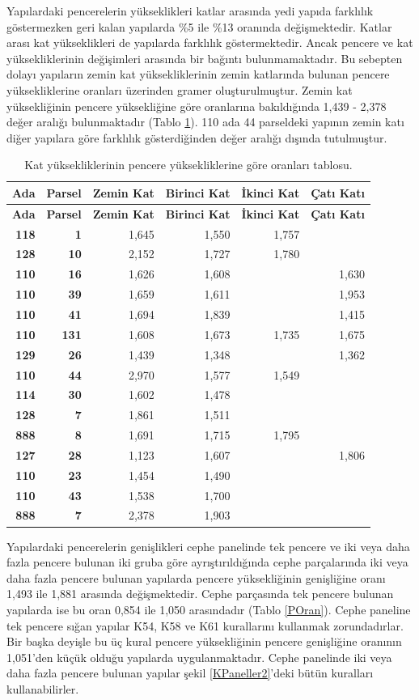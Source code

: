 \documentclass[12pt,turkish,a4paperpaper,]{report}
\begin{document}
Yapılardaki pencerelerin yükseklikleri katlar arasında yedi yapıda
farklılık göstermezken geri kalan yapılarda \%5 ile \%13 oranında
değişmektedir. Katlar arası kat yükseklikleri de yapılarda farklılık
göstermektedir. Ancak pencere ve kat yüksekliklerinin değişimleri
arasında bir bağıntı bulunmamaktadır. Bu sebepten dolayı yapıların zemin
kat yüksekliklerinin zemin katlarında bulunan pencere yüksekliklerine
oranları üzerinden gramer oluşturulmuştur. Zemin kat yüksekliğinin
pencere yüksekliğine göre oranlarına bakıldığında 1,439 - 2,378 değer
aralığı bulunmaktadır (Tablo \ref{PKOran}). 110 ada 44 parseldeki
yapının zemin katı diğer yapılara göre farklılık gösterdiğinden değer
aralığı dışında tutulmuştur.

\begin{longtable}[]{@{}rrrrrr@{}}
\caption{Kat yüksekliklerinin pencere yüksekliklerine göre oranları
tablosu. \label{PKOran}}\tabularnewline
\toprule
\textbf{Ada} & \textbf{Parsel} & \textbf{Zemin Kat} & \textbf{Birinci
Kat} & \textbf{İkinci Kat} & \textbf{Çatı Katı}\tabularnewline
\midrule
\endfirsthead
\toprule
\textbf{Ada} & \textbf{Parsel} & \textbf{Zemin Kat} & \textbf{Birinci
Kat} & \textbf{İkinci Kat} & \textbf{Çatı Katı}\tabularnewline
\midrule
\endhead
\textbf{118} & \textbf{1} & 1,645 & 1,550 & 1,757 &\tabularnewline
\textbf{128} & \textbf{10} & 2,152 & 1,727 & 1,780 &\tabularnewline
\textbf{110} & \textbf{16} & 1,626 & 1,608 & & 1,630\tabularnewline
\textbf{110} & \textbf{39} & 1,659 & 1,611 & & 1,953\tabularnewline
\textbf{110} & \textbf{41} & 1,694 & 1,839 & & 1,415\tabularnewline
\textbf{110} & \textbf{131} & 1,608 & 1,673 & 1,735 &
1,675\tabularnewline
\textbf{129} & \textbf{26} & 1,439 & 1,348 & & 1,362\tabularnewline
\textbf{110} & \textbf{44} & 2,970 & 1,577 & 1,549 &\tabularnewline
\textbf{114} & \textbf{30} & 1,602 & 1,478 & &\tabularnewline
\textbf{128} & \textbf{7} & 1,861 & 1,511 & &\tabularnewline
\textbf{888} & \textbf{8} & 1,691 & 1,715 & 1,795 &\tabularnewline
\textbf{127} & \textbf{28} & 1,123 & 1,607 & & 1,806\tabularnewline
\textbf{110} & \textbf{23} & 1,454 & 1,490 & &\tabularnewline
\textbf{110} & \textbf{43} & 1,538 & 1,700 & &\tabularnewline
\textbf{888} & \textbf{7} & 2,378 & 1,903 & &\tabularnewline
\bottomrule
\end{longtable}

Yapılardaki pencerelerin genişlikleri cephe panelinde tek pencere ve iki
veya daha fazla pencere bulunan iki gruba göre ayrıştırıldığında cephe
parçalarında iki veya daha fazla pencere bulunan yapılarda pencere
yüksekliğinin genişliğine oranı 1,493 ile 1,881 arasında değişmektedir.
Cephe parçasında tek pencere bulunan yapılarda ise bu oran 0,854 ile
1,050 arasındadır (Tablo \ref{POran}). Cephe paneline tek pencere sığan
yapılar K54, K58 ve K61 kurallarını kullanmak zorundadırlar. Bir başka
deyişle bu üç kural pencere yüksekliğinin pencere genişliğine oranının
1,051'den küçük olduğu yapılarda uygulanmaktadır. Cephe panelinde iki
veya daha fazla pencere bulunan yapılar şekil \ref{KPaneller2}'deki
bütün kuralları kullanabilirler.
\end{document}
